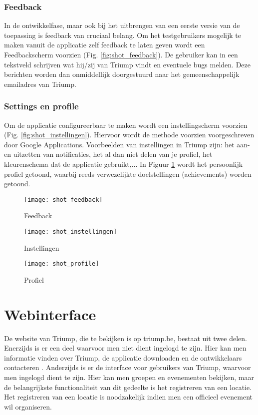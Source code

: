 \subsubsection{Feedback}%
In de ontwikkelfase, maar ook bij het uitbrengen van een eerste versie van de toepassing is feedback van cruciaal belang. Om het testgebruikers mogelijk te maken vanuit de applicatie zelf feedback te laten geven wordt een Feedbackscherm voorzien (Fig. \ref{fig:shot_feedback}). De gebruiker kan in een tekstveld schrijven wat hij/zij van Triump vindt en eventuele bugs melden. Deze berichten worden dan onmiddellijk doorgestuurd naar het gemeenschappelijk emailadres van Triump.
\subsubsection{Settings en profile}%
Om de applicatie configureerbaar te maken wordt een instellingscherm voorzien (Fig. \ref{fig:shot_instellingen}). Hiervoor wordt de methode voorzien voorgeschreven door Google Applications.
Voorbeelden van instellingen in Triump zijn: het aan- en uitzetten van notificaties, het al dan niet delen van je profiel, het kleurenschema dat de applicatie gebruikt,... 
In Figuur \ref{fig:shot_profile} wordt het persoonlijk profiel getoond, waarbij reeds verwezelijkte doelstellingen (achievements) worden getoond. 

\begin{figure}[ht]

\begin{minipage}[b]{0.25\linewidth}
\centering
\texttt{[image: shot\_feedback]}
\caption{Feedback}
\label{fig:shot_feedback}
\end{minipage}
\hspace{1.5cm}
\begin{minipage}[b]{0.25\linewidth}
\centering
\texttt{[image: shot\_instellingen]}
\caption{Instellingen}
\label{fig:shot_instellingen}
\end{minipage}
\hspace{1.5cm}
\begin{minipage}[b]{0.25\linewidth}
\centering
\texttt{[image: shot\_profile]}
\caption{Profiel}
\label{fig:shot_profile}
\end{minipage}
\end{figure}

\section{Webinterface}%
De website van Triump, die te bekijken is op triump.be, bestaat uit twee delen. Enerzijds is er een deel waarvoor men niet dient ingelogd te zijn. Hier kan men informatie vinden over Triump, de applicatie downloaden en de ontwikkelaars contacteren . Anderzijds is er de interface voor gebruikers van Triump, waarvoor men ingelogd dient te zijn. Hier kan men groepen en evenementen bekijken, maar de belangrijkste functionaliteit van dit gedeelte is het registreren van een locatie.
Het registreren van een locatie is noodzakelijk indien men een officieel evenement wil organiseren.
